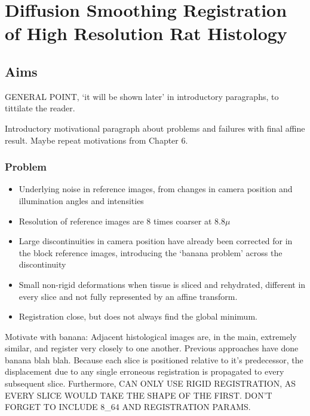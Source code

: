 \chapter{Diffusion Smoothing Registration of High Resolution Rat Histology} %
\label{cha:diffusion_smoothing_registration_of_high_resolution_rat_histology}

\dblspace

\section{Aims} %
\label{sec:aims}
  GENERAL POINT, `it will be shown later' in introductory paragraphs, to tittilate the reader.
  
  Introductory motivational paragraph about problems and failures with final affine result. Maybe repeat motivations from Chapter 6.
  
  \subsection{Problem}
    \begin{itemize}
      \item Underlying noise in reference images, from changes in camera position and illumination angles and intensities
      \item Resolution of reference images are 8 times coarser at 8.8$\mu$ 
      \item Large discontinuities in camera position have already been corrected for in the block reference images, introducing the `banana problem' across the discontinuity
      \item Small non-rigid deformations when tissue is sliced and rehydrated, different in every slice and not fully represented by an affine transform.
      \item Registration close, but does not always find the global minimum.
    \end{itemize}
    
    Motivate with banana: Adjacent histological images are, in the main, extremely similar, and register very closely to one another. Previous approaches have done banana blah blah. Because each slice is positioned relative to it's predecessor, the displacement due to any single erroneous registration is propagated to every subsequent slice. Furthermore, CAN ONLY USE RIGID REGISTRATION, AS EVERY SLICE WOULD TAKE THE SHAPE OF THE FIRST. DON'T FORGET TO INCLUDE 8\_64 AND REGISTRATION PARAMS.
    
